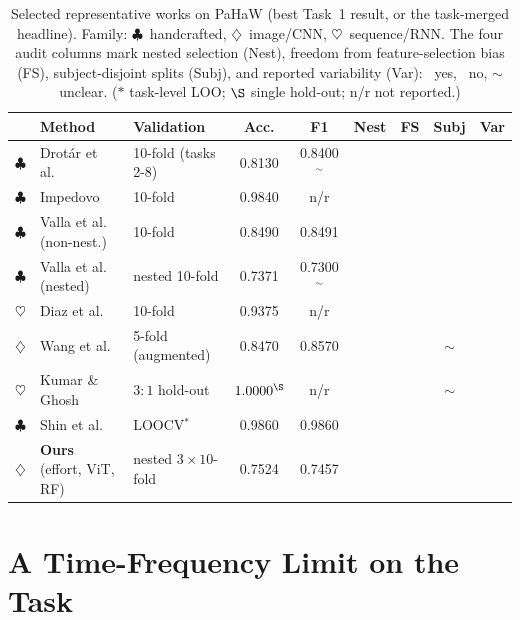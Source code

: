 \documentclass{article}
\newcommand{\cmark}{\textcolor{effc}{\ding{51}}}
\newcommand{\xmark}{\textcolor{red!65!black}{\ding{55}}}
\newcommand{\hand}{\textcolor{effc}{$\clubsuit$}}   %
\newcommand{\img}{\textcolor{vitc}{$\diamondsuit$}} %
\newcommand{\seq}{\textcolor{swinc}{$\heartsuit$}}  %
\begin{document}
\begin{table}[t]
\caption{Selected representative works on PaHaW (best Task~1 result, or the
task-merged headline). Family: \hand~handcrafted, \img~image/CNN, \seq~sequence/RNN.
The four audit columns mark nested selection (Nest), freedom from feature-selection
bias (FS), subject-disjoint splits (Subj), and reported variability (Var):
\cmark~yes, \xmark~no, $\sim$ unclear. ($\ast$ task-level LOO; $\S$ single hold-out;
n/r not reported.)}
\label{tab:comparison}
\centering
\small
\setlength{\tabcolsep}{5.5pt}
\renewcommand{\arraystretch}{1.15}
\begin{tabular}{@{}cllcccccc@{}}
\toprule
 & Method & Validation & Acc. & F1 & Nest & FS & Subj & Var \\
\midrule
\hand & Drot\'ar et al.\ \citep{drotar2016}        & 10-fold (tasks 2-8) & 0.8130 & 0.8400$^\sim$ & \xmark & \xmark & \cmark & \xmark \\
\hand & Impedovo \citep{impedovo2019}              & 10-fold                 & 0.9840 & n/r           & \xmark & \xmark & \cmark & \xmark \\
\hand & Valla et al.\ \citep{valla2022} (non-nest.)& 10-fold                 & 0.8490 & 0.8491        & \xmark & \xmark & \cmark & \xmark \\
\hand & Valla et al.\ \citep{valla2022} (nested)   & nested 10-fold          & 0.7371 & 0.7300$^\sim$ & \cmark & \cmark & \cmark & \xmark \\
\seq  & Diaz et al.\ \citep{diaz2021}              & 10-fold                 & 0.9375 & n/r           & \xmark & \xmark & \cmark & \xmark \\
\img  & Wang et al.\ \citep{wang2024bspc}          & 5-fold (augmented)      & 0.8470 & 0.8570        & \xmark & \xmark & $\sim$ & \xmark \\
\seq  & Kumar \& Ghosh \citep{kumar2024}           & $3{:}1$ hold-out         & $1.0000^\S$ & n/r      & \xmark & \xmark & $\sim$ & \xmark \\
\hand & Shin et al.\ \citep{shin2025}              & LOOCV$^\ast$            & 0.9860 & 0.9860        & \xmark & \xmark & \xmark & \xmark \\
\midrule
\rowcolor{rowhi}
\img & \textbf{Ours} (effort, ViT, RF) & nested $3{\times}10$-fold & 0.7524 & 0.7457 & \cmark & \cmark & \cmark & \cmark \\
\bottomrule
\end{tabular}
\end{table}

\section{A Time-Frequency Limit on the Task}
\label{sec:theory}
\end{document}
